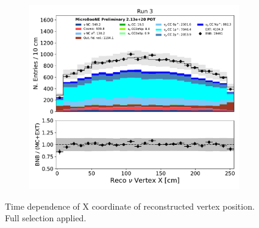 \begin{figure}[hbt!]
\begin{center}
\begin{subfigure}[b]{0.35\textwidth}
    \end{subfigure}
    \begin{subfigure}[b]{0.35\textwidth}
        \centering
        \includegraphics[width=1.00\textwidth]{NuMuCCsel/Images/Ryan/Run3_nocrt/reco_nu_vtx_sce_x_08072020_fullsel_samples_longest_noCRT_event_category.pdf}
    \end{subfigure} %
\caption{Time dependence of X coordinate of reconstructed vertex position. Full selection applied.}
\label{fig:NuMuCCsel:timedep:vtxX_fullsel}
\end{center}
\end{figure}

